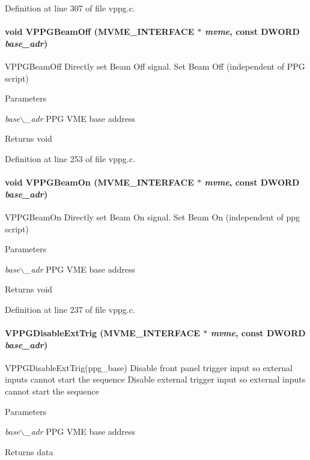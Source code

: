 Definition at line 307 of file vppg.c.
\paragraph[{VPPGBeamOff}]{\setlength{\rightskip}{0pt plus 5cm}void VPPGBeamOff ({\bf MVME\_\-INTERFACE} $\ast$ {\em mvme}, \/  const {\bf DWORD} {\em base\_\-adr})}\hfill\label{vppg_8c_a2cdff7a4d21921939992eba5946ea4ad}
VPPGBeamOff Directly set Beam Off signal.  Set Beam Off (independent of PPG script) 
\begin{DoxyParams}{Parameters}
\item[{\em base$\backslash$\_\-adr}]PPG VME base address \end{DoxyParams}
\begin{DoxyReturn}{Returns}
void 
\end{DoxyReturn}


Definition at line 253 of file vppg.c.
\paragraph[{VPPGBeamOn}]{\setlength{\rightskip}{0pt plus 5cm}void VPPGBeamOn ({\bf MVME\_\-INTERFACE} $\ast$ {\em mvme}, \/  const {\bf DWORD} {\em base\_\-adr})}\hfill\label{vppg_8c_acbbb2e3ab52f1662cfd8fba628ebf1ca}
VPPGBeamOn Directly set Beam On signal.  Set Beam On (independent of ppg script) 
\begin{DoxyParams}{Parameters}
\item[{\em base$\backslash$\_\-adr}]PPG VME base address \end{DoxyParams}
\begin{DoxyReturn}{Returns}
void 
\end{DoxyReturn}


Definition at line 237 of file vppg.c.
\paragraph[{VPPGDisableExtTrig}]{ VPPGDisableExtTrig ({\bf MVME\_\-INTERFACE} $\ast$ {\em mvme}, \/  const {\bf DWORD} {\em base\_\-adr})}\hfill\label{vppg_8c_a137e2408b777c360d4adc12f37ed90e6}
VPPGDisableExtTrig(ppg\_\-base) Disable front panel trigger input so external inputs cannot start the sequence  Disable external trigger input so external inputs cannot start the sequence 
\begin{DoxyParams}{Parameters}
\item[{\em base$\backslash$\_\-adr}]PPG VME base address \end{DoxyParams}
\begin{DoxyReturn}{Returns}
data 
\end{DoxyReturn}


